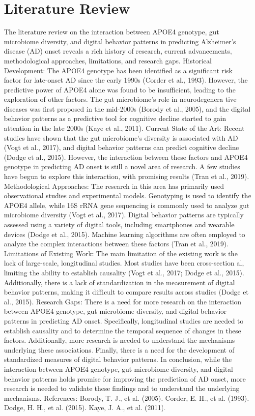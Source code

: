 \documentclass[conference]{IEEEtran}
\begin{document}
\section{Literature Review}
The literature review on the interaction between APOE4 genotype, gut microbiome diversity, and digital behavior patterns in predicting Alzheimer's disease (AD) onset reveals a rich history of research, current advancements, methodological approaches, limitations, and research gaps. Historical Development: The APOE4 genotype has been identified as a significant risk factor for late-onset AD since the early 1990s (Corder et al., 1993). However, the predictive power of APOE4 alone was found to be insufficient, leading to the exploration of other factors. The gut microbiome's role in neurodegenera tive diseases was first proposed in the mid-2000s (Borody et al., 2005), and the digital behavior patterns as a predictive tool for cognitive decline started to gain attention in the late 2000s (Kaye et al., 2011). Current State of the Art: Recent studies have shown that the gut microbiome's diversity is associated with AD (Vogt et al., 2017), and digital behavior patterns can predict cognitive decline (Dodge et al., 2015). However, the interaction between these factors and APOE4 genotype in predicting AD onset is still a novel area of research. A few studies have begun to explore this interaction, with promising results (Tran et al., 2019). Methodological Approaches: The research in this area has primarily used observational studies and experimental models. Genotyping is used to identify the APOE4 allele, while 16S rRNA gene sequencing is commonly used to analyze gut microbiome diversity (Vogt et al., 2017). Digital behavior patterns are typically assessed using a variety of digital tools, including smartphones and wearable devices (Dodge et al., 2015). Machine learning algorithms are often employed to analyze the complex interactions between these factors (Tran et al., 2019). Limitations of Existing Work: The main limitation of the existing work is the lack of large-scale, longitudinal studies. Most studies have been cross-section al, limiting the ability to establish causality (Vogt et al., 2017; Dodge et al., 2015). Additionally, there is a lack of standardization in the measurement of digital behavior patterns, making it difficult to compare results across studies (Dodge et al., 2015). Research Gaps: There is a need for more research on the interaction between APOE4 genotype, gut microbiome diversity, and digital behavior patterns in predicting AD onset. Specifically, longitudinal studies are needed to establish causality and to determine the temporal sequence of changes in these factors. Additionally, more research is needed to understand the mechanisms underlying these associations. Finally, there is a need for the development of standardized measures of digital behavior patterns. In conclusion, while the interaction between APOE4 genotype, gut microbiome diversity, and digital behavior patterns holds promise for improving the prediction of AD onset, more research is needed to validate these findings and to understand the underlying mechanisms. References: Borody, T. J., et al. (2005). Corder, E. H., et al. (1993). Dodge, H. H., et al. (2015). Kaye, J. A., et al. (2011). 
\end{document}
